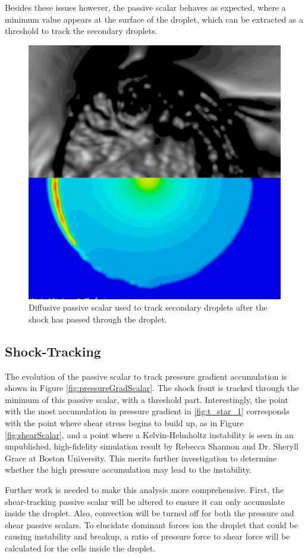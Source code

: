 \documentclass{UCF_ETD}
\begin{document}
Besides these issues however, the passive scalar behaves as expected, where a minimum value appears at the surface of the droplet, which can be extracted as a threshold to track the secondary droplets.

\begin{figure}[htp!]
\centering
\includegraphics[width=.5\textwidth]{Figures/secondaryDropPassiveScalar.png}
\caption{Diffusive passive scalar used to track secondary droplets after the shock has passed through the droplet.}
\label{fig:secondaryDropResult}
\end{figure}

\subsection{Shock-Tracking}
\label{subsec:shockTrackingResults}

The evolution of the passive scalar to track pressure gradient accumulation is shown in Figure \ref{fig:pressureGradScalar}. The shock front is tracked through the minimum of this passive scalar, with a threshold part. Interestingly, the point with the most accumulation in pressure gradient in \ref{fig:t_star_1} corresponds with the point where shear stress begins to build up, as in Figure \ref{fig:shearScalar}, and a point where a Kelvin-Helmholtz instability is seen in an unpublished, high-fidelity simulation result by Rebecca Shannon and Dr. Sheryll Grace at Boston University. This merits further investigation to determine whether the high pressure accumulation may lead to the instability. 

Further work is needed to make this analysis more comprehensive. First, the shear-tracking passive scalar will be altered to ensure it can only accumulate inside the droplet. Also, convection will be turned off for both the pressure and shear passive scalars. To elucidate dominant forces ion the droplet that could be causing instability and breakup, a ratio of pressure force to shear force will be calculated for the cells inside the droplet.
\end{document}
